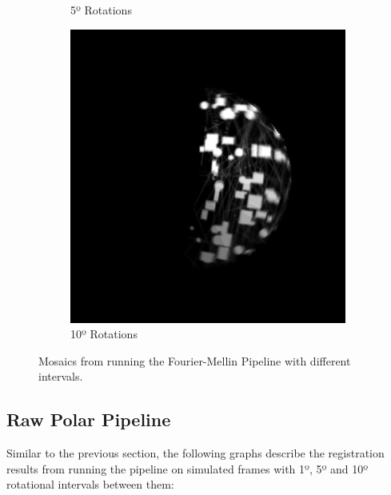 \begin{figure}[H]
\begin{subfigure}[b]{.48\textwidth}
        \caption{5º Rotations}
    \end{subfigure}
    \hfill
    \begin{subfigure}[b]{.48\textwidth}
        \centering
        \includegraphics[height=\textwidth]{figures/results/Rotation-Combined/FMT-10.png}
        \caption{10º Rotations}
    \end{subfigure}
    \hfill
    \caption{Mosaics from running the Fourier-Mellin Pipeline with different intervals.}
    \label{fig:fmtmosaic}
\end{figure}


\subsection{Raw Polar Pipeline}

Similar to the previous section, the following graphs describe the registration results from running the pipeline on simulated frames with 1º, 5º and 10º rotational intervals between them:

